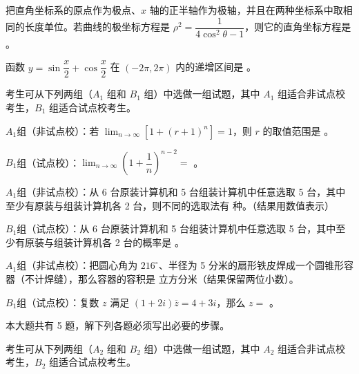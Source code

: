 \begin{question}
把直角坐标系的原点作为极点、$x$ 轴的正半轴作为极轴，并且在两种坐标系中取相同的长度单位。若曲线的极坐标方程是 $\rho^2=\dfrac1{4\cos^2\theta-1}$，则它的直角坐标方程是 \gkblank{}。

\end{question}
\begin{question}
函数 $y=\sin\dfrac x2+\cos\dfrac x2$ 在 $(-2\pi,2\pi)$ 内的递增区间是 \gkblank{}。

\end{question}

考生可从下列两组（$A_1$ 组和 $B_1$ 组）中选做一组试题，其中 $A_1$ 组适合非试点校考生，$B_1$ 组适合试点校考生。

\begin{question}

$A_1$组（非试点校）：若 $\lim_{n\to\infty}[1+(r+1)^n]=1$，则 $r$ 的取值范围是 \gkblank{}。

$B_1$组（试点校）：$\lim_{n\to\infty}\left(1+\dfrac1n\right)^{n-2}=$ \gkblank{}。

\end{question}
\begin{question}

$A_1$组（非试点校）：从 6 台原装计算机和 5 台组装计算机中任意选取 5 台，其中至少有原装与组装计算机各 2 台，则不同的选取法有 \gkblank{} 种。（结果用数值表示）

$B_1$组（试点校）：从 6 台原装计算机和 5 台组装计算机中任意选取 5 台，其中至少有原装与组装计算机各 2 台的概率是 \gkblank{}。

\end{question}
\begin{question}

$A_1$组（非试点校）：把圆心角为 $216^\circ$、半径为 5 分米的扇形铁皮焊成一个圆锥形容器（不计焊缝），那么容器的容积是 \gkblank{} 立方分米（结果保留两位小数）。

$B_1$组（试点校）：复数 $z$ 满足 $(1+2i)\overline z=4+3i$，那么 $z=$ \gkblank{}。

\end{question}

本大题共有 5 题，解下列各题必须写出必要的步骤。


考生可从下列两组（$A_2$ 组和 $B_2$ 组）中选做一组试题，其中 $A_2$ 组适合非试点校考生，$B_2$ 组适合试点校考生。

